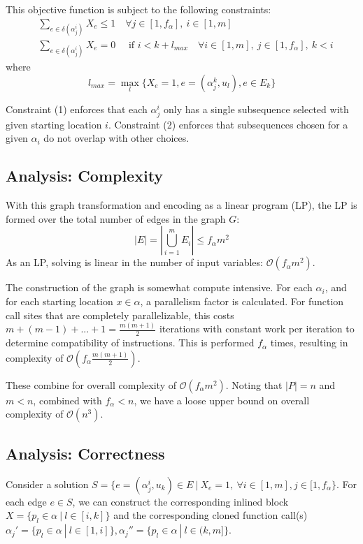 \documentclass[12pt,twoside]{article}
\begin{document}
	This objective function is subject to the following constraints:
	\begin{align}
		&\sum_{e \in \delta(\alpha_j^i)} X_e \leq 1 \quad \forall j \in [1, f_{\alpha}],\ i \in [1, m] \tag{1} \\
		&\sum_{e \in \delta(\alpha_j^i)} X_e = 0 \quad \text{ if } i < k + l_{max} \quad \forall i \in [1,m],\ j \in [1,f_{\alpha}],\ k<i \tag{2}
	\end{align}
	where \begin{equation}
		l_{max} = \max_l \{X_e = 1, e = ( \alpha_j^k, u_l), e \in E_k\}
	\end{equation}

	Constraint (1) enforces that each $\alpha_j^i$ only has a single subsequence selected with given starting location $i$. Constraint (2) enforces that subsequences chosen for a given $\alpha_i$ do not overlap with other choices.   

\subsection{Analysis: Complexity}
With this graph transformation and encoding as a linear program (LP), the LP is formed over the total number of edges in the graph $G$:
	\begin{equation}
		|E| = |\bigcup_{i=1}^m E_i| \leq f_{\alpha}m^2 
	\end{equation}
	As an LP, solving is linear in the number of input variables: $\mathcal{O}(f_{\alpha}m^2)$. 

The construction of the graph is somewhat compute intensive. For each $\alpha_i$, and for each starting location $x \in \alpha$, a parallelism factor is calculated. For function call sites that are completely parallelizable, this costs $m + (m-1) + ... + 1 = \frac{m(m+1)}{2}$ iterations with constant work per iteration to determine compatibility of instructions. This is performed $f_{\alpha}$ times, resulting in complexity of $\mathcal{O}(f_{\alpha}\frac{m(m+1)}{2})$. 

These combine for overall complexity of $\mathcal{O}(f_{\alpha}m^2)$. Noting that $|P| = n$ and $m < n$, combined with $f_\alpha < n$, we have a loose upper bound on overall complexity of $\mathcal{O}(n^3)$.

\subsection{Analysis: Correctness}
Consider a solution $S = \{e = (\alpha_j^i,u_k) \in E\ |\ X_e = 1,\ \forall i \in [1,m], j \in [1,f_{\alpha}\}$. For each edge $e \in S$, we can construct the corresponding inlined block $X = \{p_l \in \alpha\ |\ l \in [i,k]\}$ and the corresponding cloned function call(s) $\alpha_j' = \{p_l \in \alpha\ |\ l \in [1,i]\}, \alpha_j'' = \{p_l \in \alpha\ |\ l \in (k,m]\}$.
\end{document}
